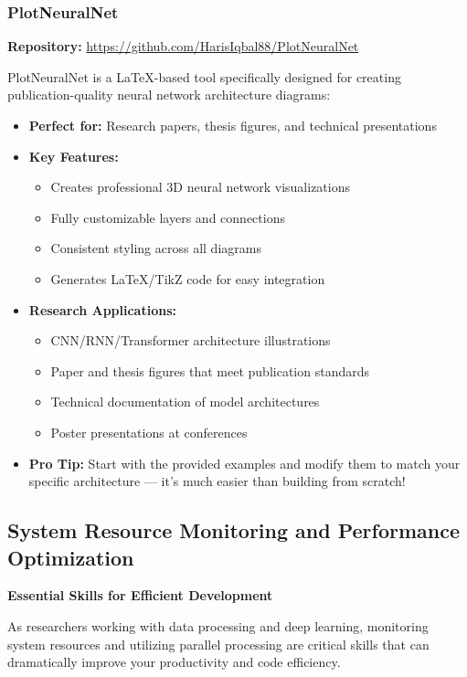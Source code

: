 \documentclass[11pt,a4paper]{article}
\begin{document}
\subsubsection{PlotNeuralNet}
\textbf{Repository:} \url{https://github.com/HarisIqbal88/PlotNeuralNet}

PlotNeuralNet is a LaTeX-based tool specifically designed for creating publication-quality neural network architecture diagrams:
\begin{itemize}
    \item \textbf{Perfect for:} Research papers, thesis figures, and technical presentations
    \item \textbf{Key Features:}
    \begin{itemize}
        \item Creates professional 3D neural network visualizations
        \item Fully customizable layers and connections
        \item Consistent styling across all diagrams
        \item Generates LaTeX/TikZ code for easy integration
    \end{itemize}
    \item \textbf{Research Applications:}
    \begin{itemize}
        \item CNN/RNN/Transformer architecture illustrations
        \item Paper and thesis figures that meet publication standards
        \item Technical documentation of model architectures
        \item Poster presentations at conferences
    \end{itemize}
    \item \textbf{Pro Tip:} Start with the provided examples and modify them to match your specific architecture — it's much easier than building from scratch!
\end{itemize}

\subsection{System Resource Monitoring and Performance Optimization}

\textbf{Essential Skills for Efficient Development}

As researchers working with data processing and deep learning, monitoring system resources and utilizing parallel processing are critical skills that can dramatically improve your productivity and code efficiency.
\end{document}
